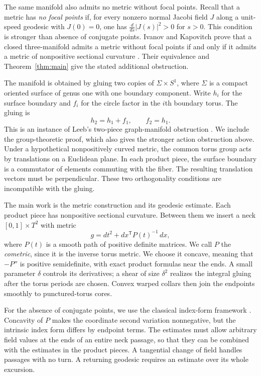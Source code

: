 The same manifold also admits no metric without focal points.
Recall that a metric has \emph{no focal points} if, for every nonzero
normal Jacobi field $J$ along a unit-speed geodesic with $J(0)=0$,
one has $\frac{d}{ds}|J(s)|^2>0$ for $s>0$. This condition is stronger
than absence of conjugate points. Ivanov and Kapovitch prove that a
closed three-manifold admits a metric without focal points if and only
if it admits a metric of nonpositive sectional curvature
\cite[Theorem~7.1]{IvanovKapovitch2014}. Their equivalence and
Theorem~\ref{thm:main} give the stated additional obstruction.

The manifold is obtained by gluing two copies of $\Sigma\times S^1$,
where $\Sigma$ is a compact oriented surface of genus one with one
boundary component. Write $h_i$ for the surface boundary and $f_i$ for
the circle factor in the $i$th boundary torus. The gluing is
\[
 h_2=h_1+f_1,\qquad f_2=h_1.
\]
This is an instance of Leeb's two-piece graph-manifold obstruction
\cite[Section~4.1, Example~4.1]{Leeb1995}. We include the group-theoretic
proof, which also gives the stronger action obstruction above.
Under a hypothetical nonpositively curved metric, the common torus
group acts by translations on a Euclidean plane. In each product piece,
the surface boundary is a commutator of elements commuting with the
fiber. The resulting translation vectors must be perpendicular.
These two orthogonality conditions are incompatible with the gluing.

The main work is the metric construction and its geodesic estimate.
Each product piece has nonpositive sectional curvature. Between them
we insert a neck $[0,1]\times T^2$ with metric
\[
 g=dt^2+dx^{\mathsf T}P(t)^{-1}\,dx,
\]
where $P(t)$ is a smooth path of positive definite matrices. We call
$P$ the \emph{cometric}, since it is the inverse torus metric. We choose
it concave, meaning that $-P''$ is positive semidefinite, with exact
product formulas near the ends. A small parameter $\delta$ controls
its derivatives; a shear of size $\delta^2$ realizes the integral
gluing after the torus periods are chosen. Convex warped collars then
join the endpoints smoothly to punctured-torus cores.

For the absence of conjugate points, we use the classical index-form
framework \cite[Sections~13--15]{Milnor1963}. Concavity of $P$ makes
the coordinate second variation nonnegative, but the intrinsic index
form differs by endpoint terms. The estimates must allow arbitrary
field values at the ends of an entire neck passage, so that they can
be combined with the estimates in the product pieces. A tangential
change of field handles passages with no turn. A returning geodesic
requires an estimate over its whole excursion.

